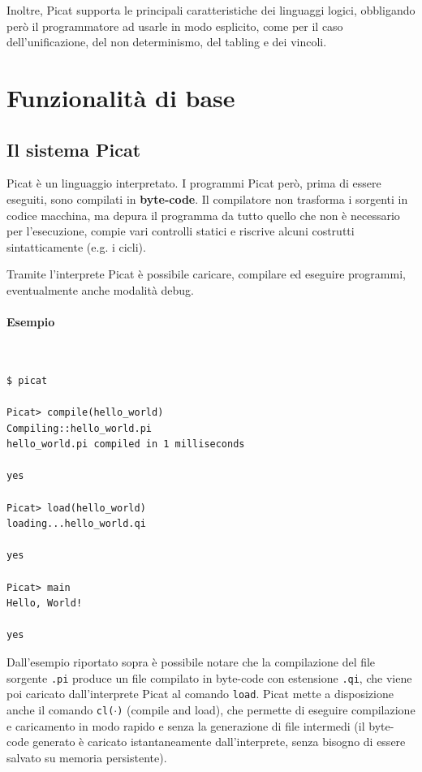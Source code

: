 \documentclass[12pt,a4paper,openright]{book}  %
\begin{document}
Inoltre, Picat supporta le principali caratteristiche dei linguaggi
logici, obbligando però il programmatore ad usarle in modo esplicito,
come per il caso dell'unificazione, del non determinismo, del tabling
e dei vincoli.

\section{Funzionalità di base}
\label{sec:picat_base}

\subsection{Il sistema Picat}
\label{subsec:picat_base_system}

Picat è un linguaggio interpretato. I programmi Picat però, prima di
essere eseguiti, sono compilati in \textbf{byte-code}. Il compilatore
non trasforma i sorgenti in codice macchina, ma depura il programma da
tutto quello che non è necessario per l'esecuzione, compie vari
controlli statici e riscrive alcuni costrutti sintatticamente (e.g. i
cicli).

Tramite l'interprete Picat è possibile caricare, compilare ed eseguire
programmi, eventualmente anche modalità debug.

\paragraph{Esempio}\
\begin{verbatim}
$ picat 

Picat> compile(hello_world)
Compiling::hello_world.pi
hello_world.pi compiled in 1 milliseconds

yes

Picat> load(hello_world)
loading...hello_world.qi

yes

Picat> main
Hello, World!

yes
\end{verbatim}

Dall'esempio riportato sopra è possibile notare che la compilazione
del file sorgente \texttt{.pi} produce un file compilato in byte-code
con estensione \texttt{.qi}, che viene poi caricato dall'interprete
Picat al comando \texttt{load}. Picat mette a disposizione anche il
comando \texttt{cl($\cdot$)} (compile and load), che permette di
eseguire compilazione e caricamento in modo rapido e senza la
generazione di file intermedi (il byte-code generato è caricato
istantaneamente dall'interprete, senza bisogno di essere salvato su
memoria persistente).
\end{document}
